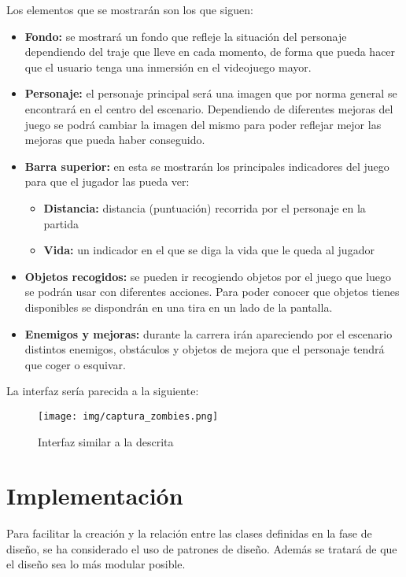 \documentclass[palatino]{apuntes}
\begin{document}
\begin{itemize}
Los elementos que se mostrarán son los que siguen:
\begin{itemize}
	\item \textbf{Fondo:} se mostrará un fondo que refleje la situación del personaje dependiendo del traje que lleve en cada momento, de forma que pueda hacer que el usuario tenga una inmersión en el videojuego mayor.
	\item \textbf{Personaje:} el personaje principal será una imagen que por norma general se encontrará en el centro del escenario. Dependiendo de diferentes mejoras del juego se podrá cambiar la imagen del mismo para poder reflejar mejor las mejoras que pueda haber conseguido.
	\item \textbf{Barra superior:} en esta se mostrarán los principales indicadores del juego para que el jugador las pueda ver:
		\begin{itemize}
			\item \textbf{Distancia:} distancia (puntuación) recorrida por el personaje en la partida
			\item \textbf{Vida:} un indicador en el que se diga la vida que le queda al jugador
		\end{itemize}
	\item \textbf{Objetos recogidos:} se pueden ir recogiendo objetos por el juego que luego se podrán usar con diferentes acciones. Para poder conocer que objetos tienes disponibles se dispondrán en una tira en un lado de la pantalla.
	
	\item \textbf{Enemigos y mejoras:} durante la carrera irán apareciendo por el escenario distintos enemigos, obstáculos y objetos de mejora que el personaje tendrá que coger o esquivar.
\end{itemize}

La interfaz sería parecida a la siguiente:

\begin{figure}[hbtp]
    \centering
    \texttt{[image: img/captura\_zombies.png]}
    \caption{Interfaz similar a la descrita}
    \label{fig:interfazzombie}
\end{figure}


\chapter{Implementación}
Para facilitar la creación y la relación entre las clases definidas en la fase de diseño, se ha considerado el uso de patrones de diseño. Además se tratará de que el diseño sea lo más modular posible.


\end{itemize}
\end{document}
